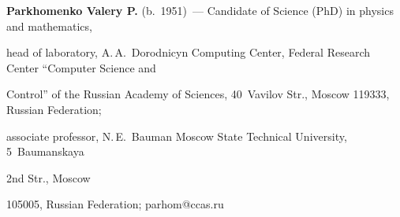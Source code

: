   


  \Contrl


  


  \noindent


\textbf{Parkhomenko Valery P.} (b.\ 1951)~--- Candidate of Science (PhD) in physics and mathematics, 


head of laboratory, A.\,A.~Dorodnicyn Computing Center, Federal Research Center ``Computer Science and 


Control'' of the Russian Academy of Sciences, 40~Vavilov Str., Moscow 119333, Russian Federation; 


associate professor, N.\,E.~Bauman Moscow State Technical University, 5~Baumanskaya 


2nd Str., Moscow 


105005, Russian Federation; \mbox{parhom@ccas.ru}


  


\label{end\stat}








\renewcommand{\bibname}{\protect\rm Литература} 



